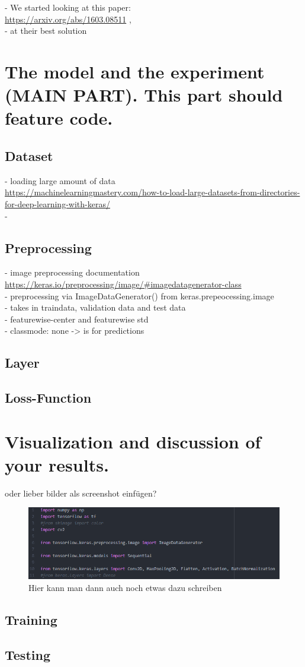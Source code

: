 \documentclass[12pt,letterpaper]{article}
\begin{document}
- We started looking at this paper: \\
\url{https://arxiv.org/abs/1603.08511} , \\
- at their best solution
\section{The model and the experiment (MAIN PART). This part should feature code.}
\subsection{Dataset}
- loading large amount of data\\
\url{https://machinelearningmastery.com/how-to-load-large-datasets-from-directories-for-deep-learning-with-keras/}\\
- 
\subsection{Preprocessing}
- image preprocessing documentation\\
\url{https://keras.io/preprocessing/image/#imagedatagenerator-class}\\
- preprocessing via ImageDataGenerator() from keras.prepeocessing.image\\
- takes in traindata, validation data and test data\\
- featurewise-center and featurewise std\\
- classmode: none -> is for predictions\\

\subsection{Layer}
\subsection{Loss-Function}
\section{Visualization and discussion of your results.}
oder lieber bilder als screenshot einfügen?\\
\begin{figure}[ht]
	\centering
	\includegraphics[width=1.0\textwidth]{bsp.png}
	\caption{Hier kann man dann auch noch etwas dazu schreiben}
	\label{fig1}
\end{figure}
\subsection{Training}
\subsection{Testing}
	
\end{document}

